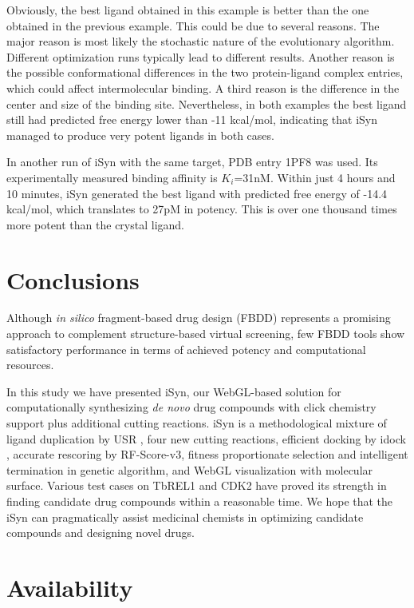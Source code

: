 Obviously, the best ligand obtained in this example is better than the one obtained in the previous example. This could be due to several reasons. The major reason is most likely the stochastic nature of the evolutionary algorithm. Different optimization runs typically lead to different results. Another reason is the possible conformational differences in the two protein-ligand complex entries, which could affect intermolecular binding. A third reason is the difference in the center and size of the binding site. Nevertheless, in both examples the best ligand still had predicted free energy lower than -11 kcal/mol, indicating that iSyn managed to produce very potent ligands in both cases.

In another run of iSyn with the same target, PDB entry 1PF8 was used. Its experimentally measured binding affinity is $K_i$=31nM. Within just 4 hours and 10 minutes, iSyn generated the best ligand with predicted free energy of -14.4 kcal/mol, which translates to 27pM in potency. This is over one thousand times more potent than the crystal ligand.

\section{Conclusions}

Although \textit{in silico} fragment-based drug design (FBDD) represents a promising approach to complement structure-based virtual screening, few FBDD tools show satisfactory performance in terms of achieved potency and computational resources.

In this study we have presented iSyn, our WebGL-based solution for computationally synthesizing \textit{de novo} drug compounds with click chemistry support plus additional cutting reactions. iSyn is a methodological mixture of ligand duplication by USR \citep{1379}, four new cutting reactions, efficient docking by idock \citep{1153}, accurate rescoring by RF-Score-v3, fitness proportionate selection and intelligent termination in genetic algorithm, and WebGL visualization with molecular surface. Various test cases on TbREL1 and CDK2 have proved its strength in finding candidate drug compounds within a reasonable time. We hope that the iSyn can pragmatically assist medicinal chemists in optimizing candidate compounds and designing novel drugs.

\section{Availability}

